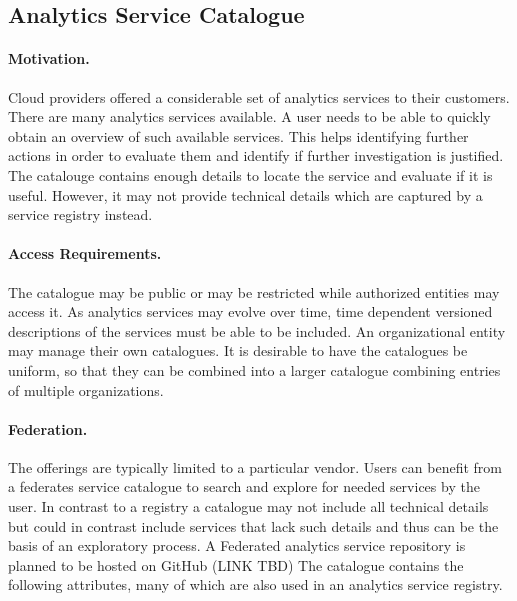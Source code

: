 
\subsection{Analytics Service Catalogue}
\label{sec:catalog}

\paragraph*{Motivation.}
Cloud providers offered a considerable set of analytics services to
their customers. There are many analytics services available. A user
needs to be able to quickly obtain an overview of such available
services. This helps identifying further actions in order to evaluate
them and identify if further investigation is justified. The catalouge
contains enough details to locate the service and evaluate if it is
useful. However, it may not provide technical details which are
captured by a service registry instead.

\paragraph*{Access Requirements.}
The catalogue may be public or may be restricted while authorized
entities may access it. As analytics services may evolve over time,
time dependent versioned descriptions of the services must be able to
be included. An organizational entity may manage their own
catalogues. It is desirable to have the catalogues be uniform, so that
they can be combined into a larger catalogue combining entries of
multiple organizations.


\paragraph*{Federation.}
The offerings are typically limited to a particular vendor. Users can
benefit from a federates service catalogue to search and explore for
needed services by the user. In contrast to a registry a catalogue may
not include all technical details but could in contrast include
services that lack such details and thus can be the basis of an
exploratory process.  A Federated analytics service repository is
planned to be hosted on GitHub (LINK TBD) The catalogue contains the
following attributes, many of which are also used in an analytics
service registry.

